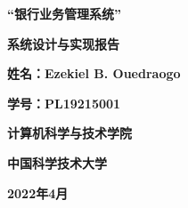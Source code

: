 \begin{titlepage}
    \begin{center}

        \vspace*{4cm}

        \Huge
        \textbf{“银行业务管理系统”}


        \vspace{4cm}

        \LARGE
        \textbf{系统设计与实现报告}

        \vspace{3cm}

        \Large
        \textbf{姓名：Ezekiel B. Ouedraogo}

        \textbf{学号：PL19215001}

        \vspace{4cm}

        \textbf{计算机科学与技术学院}

        \textbf{中国科学技术大学}

        \textbf{2022年4月}
    \end{center}
\end{titlepage}